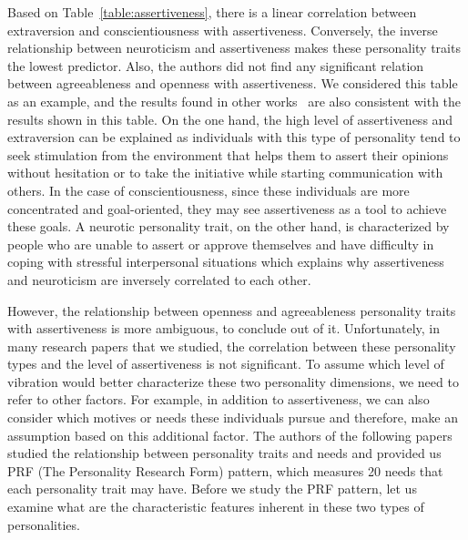 Based on Table~\ref{table:assertiveness}, there is a linear correlation between
extraversion and conscientiousness with assertiveness.
Conversely, the inverse relationship between neuroticism and assertiveness
makes these personality traits the lowest predictor.
Also, the authors did not find any significant relation between agreeableness and openness with assertiveness.
We considered this table as an example, and the results found in other
works~\cite{kirst2011investigating,ramanaiah1993neo,lefevre1981assertiveness} are
also consistent with the results shown in this table.
On the one hand, the high level of assertiveness and extraversion can be explained
as individuals with this type of personality tend to seek stimulation from the environment
that helps them to assert their opinions without hesitation or to take
the initiative while starting communication with others.
In the case of conscientiousness, since these individuals are more
concentrated and goal-oriented, they may see assertiveness as a tool to achieve these goals.
A neurotic personality trait, on the other hand, is characterized
by people who are unable to assert or approve themselves and have difficulty in coping with stressful
interpersonal situations which explains why assertiveness and neuroticism are inversely correlated to each other.

However, the relationship between openness and agreeableness personality traits with
assertiveness is more ambiguous, to conclude out of it.
Unfortunately, in many research papers that we studied, the correlation between these
personality types and the level of assertiveness is not significant.
To assume which level of vibration would better characterize
these two personality dimensions, we need to refer to other factors.
For example, in addition to assertiveness, we can also consider which motives or needs these
individuals pursue and therefore, make an assumption based on this additional factor.
The authors of the following papers~\cite{costa1988catalog} studied the relationship between
personality traits and needs and provided us PRF (The Personality Research Form) pattern,
which measures 20 needs that each personality trait may have.
Before we study the PRF pattern, let us examine what are the characteristic features
inherent in these two types of personalities.

